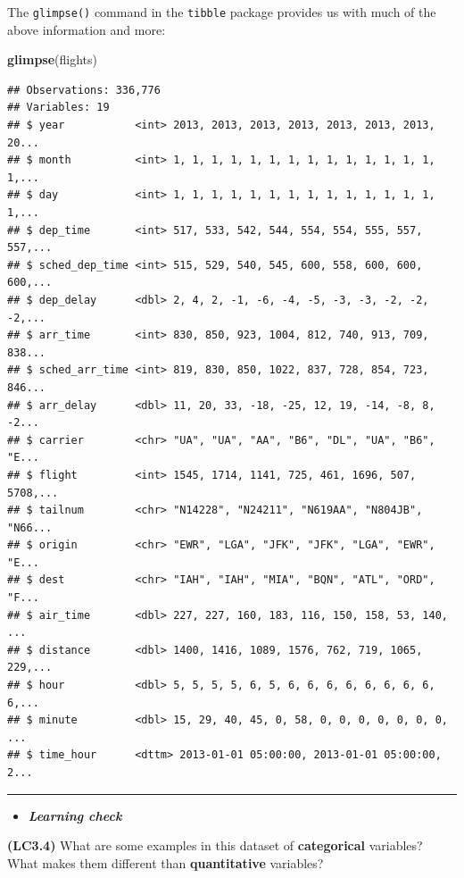 \documentclass[]{tufte-book}
\newenvironment{Shaded}{\begin{snugshade}}{\end{snugshade}}
\newcommand{\KeywordTok}[1]{\textcolor[rgb]{0.13,0.29,0.53}{\textbf{{#1}}}}
\newcommand{\NormalTok}[1]{{#1}}
\let\oldrule=\rule
\renewcommand{\rule}[1]{\oldrule{\linewidth}}
\newenvironment{rmdblock}[1]
  {\begin{shaded*}
  \begin{itemize}
  \renewcommand{\labelitemi}{
    \raisebox{-.7\height}[0pt][0pt]{
    }
  }
  \item
  }
  {
  \end{itemize}
  \end{shaded*}
  }
\newenvironment{learncheck}
  {\begin{rmdblock}{warning}}
  {\end{rmdblock}}
\theoremstyle{definition}
\theoremstyle{definition}
\theoremstyle{remark}
\begin{document}
The \texttt{glimpse()} command in the \texttt{tibble} package provides
us with much of the above information and more:

\begin{Shaded}
\begin{Highlighting}[]
\KeywordTok{glimpse}\NormalTok{(flights)}
\end{Highlighting}
\end{Shaded}

\begin{verbatim}
## Observations: 336,776
## Variables: 19
## $ year           <int> 2013, 2013, 2013, 2013, 2013, 2013, 2013, 20...
## $ month          <int> 1, 1, 1, 1, 1, 1, 1, 1, 1, 1, 1, 1, 1, 1, 1,...
## $ day            <int> 1, 1, 1, 1, 1, 1, 1, 1, 1, 1, 1, 1, 1, 1, 1,...
## $ dep_time       <int> 517, 533, 542, 544, 554, 554, 555, 557, 557,...
## $ sched_dep_time <int> 515, 529, 540, 545, 600, 558, 600, 600, 600,...
## $ dep_delay      <dbl> 2, 4, 2, -1, -6, -4, -5, -3, -3, -2, -2, -2,...
## $ arr_time       <int> 830, 850, 923, 1004, 812, 740, 913, 709, 838...
## $ sched_arr_time <int> 819, 830, 850, 1022, 837, 728, 854, 723, 846...
## $ arr_delay      <dbl> 11, 20, 33, -18, -25, 12, 19, -14, -8, 8, -2...
## $ carrier        <chr> "UA", "UA", "AA", "B6", "DL", "UA", "B6", "E...
## $ flight         <int> 1545, 1714, 1141, 725, 461, 1696, 507, 5708,...
## $ tailnum        <chr> "N14228", "N24211", "N619AA", "N804JB", "N66...
## $ origin         <chr> "EWR", "LGA", "JFK", "JFK", "LGA", "EWR", "E...
## $ dest           <chr> "IAH", "IAH", "MIA", "BQN", "ATL", "ORD", "F...
## $ air_time       <dbl> 227, 227, 160, 183, 116, 150, 158, 53, 140, ...
## $ distance       <dbl> 1400, 1416, 1089, 1576, 762, 719, 1065, 229,...
## $ hour           <dbl> 5, 5, 5, 5, 6, 5, 6, 6, 6, 6, 6, 6, 6, 6, 6,...
## $ minute         <dbl> 15, 29, 40, 45, 0, 58, 0, 0, 0, 0, 0, 0, 0, ...
## $ time_hour      <dttm> 2013-01-01 05:00:00, 2013-01-01 05:00:00, 2...
\end{verbatim}

\begin{center}\rule{0.5\linewidth}{\linethickness}\end{center}

\begin{learncheck}
\textbf{\emph{Learning check}}
\end{learncheck}

\textbf{(LC3.4)} What are some examples in this dataset of
\textbf{categorical} variables? What makes them different than
\textbf{quantitative} variables?
\end{document}

